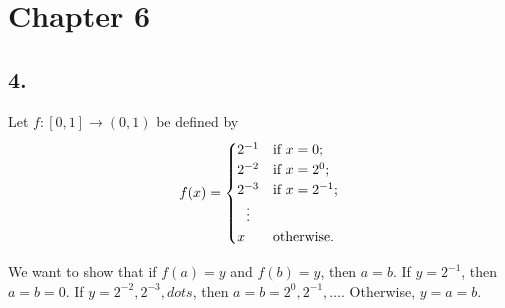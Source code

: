 \documentclass{article}
\begin{document}
\section{Chapter 6}
\subsection{4.}
Let $f:[0, 1] \to (0, 1)$ be defined by
\begin{equation}
  f(x) = 
  \begin{cases}
    2^{-1} &\text{if } x=0; \\
    2^{-2} &\text{if } x=2^0; \\
    2^{-3} &\text{if } x=2^{-1}; \\
    \vdotswithin{ 2^{-3}}\\
    x & \text{otherwise}.
  \end{cases}
\end{equation}

We want to show that if $f(a) = y$ and $f(b) = y$,
then $a = b$.
If $y = 2^{-1}$, then $a = b = 0$.
If $y = 2^{-2}, 2^{-3}, dots$, then  $a = b = 2^0, 2^{-1}, \dots$.
Otherwise, $y = a = b$.
\end{document}

